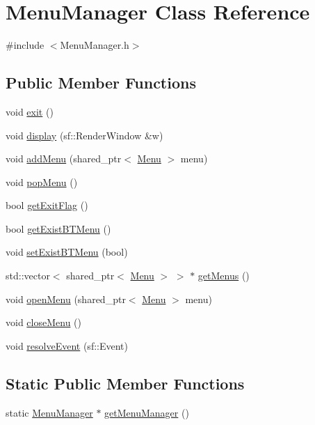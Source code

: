 \hypertarget{class_menu_manager}{\section{Menu\+Manager Class Reference}
\label{class_menu_manager}
}


{\ttfamily \#include $<$Menu\+Manager.\+h$>$}

\subsection*{Public Member Functions}
\begin{DoxyCompactItemize}
\item 
void \hyperlink{class_menu_manager_a49f86e0962807099541704a0cab8af44}{exit} ()
\item 
void \hyperlink{class_menu_manager_a03555427106f2f8c584e1e1aea02593a}{display} (sf\+::\+Render\+Window \&w)
\item 
void \hyperlink{class_menu_manager_a54996a292bfd96a3bf8b265674f6fa17}{add\+Menu} (shared\+\_\+ptr$<$ \hyperlink{class_menu}{Menu} $>$ menu)
\item 
void \hyperlink{class_menu_manager_a28849ea9b4272d42330ea5de81edc8cf}{pop\+Menu} ()
\item 
bool \hyperlink{class_menu_manager_ab66339b9e4f92951c2cf198f8a7abe38}{get\+Exit\+Flag} ()
\item 
bool \hyperlink{class_menu_manager_a46ab981e500d5ccb7cc190169efad820}{get\+Exist\+B\+T\+Menu} ()
\item 
void \hyperlink{class_menu_manager_a152d9d34cbb1e31a42958bcd23b2629c}{set\+Exist\+B\+T\+Menu} (bool)
\item 
std\+::vector$<$ shared\+\_\+ptr$<$ \hyperlink{class_menu}{Menu} $>$ $>$ $\ast$ \hyperlink{class_menu_manager_a65859149175c8f582e02256f6cfc2cfe}{get\+Menus} ()
\item 
void \hyperlink{class_menu_manager_a81c9f1266764c3d0fa2e69b99b735d7d}{open\+Menu} (shared\+\_\+ptr$<$ \hyperlink{class_menu}{Menu} $>$ menu)
\item 
void \hyperlink{class_menu_manager_af609a70fb742e899fce7e8f65a5d006a}{close\+Menu} ()
\item 
void \hyperlink{class_menu_manager_a295e8aa6a3d04c189e0efc47abe8bb85}{resolve\+Event} (sf\+::\+Event)
\end{DoxyCompactItemize}
\subsection*{Static Public Member Functions}
\begin{DoxyCompactItemize}
\item 
static \hyperlink{class_menu_manager}{Menu\+Manager} $\ast$ \hyperlink{class_menu_manager_a39e9e52cee6594f32cb56b3bb75ebdb5}{get\+Menu\+Manager} ()
\end{DoxyCompactItemize}
